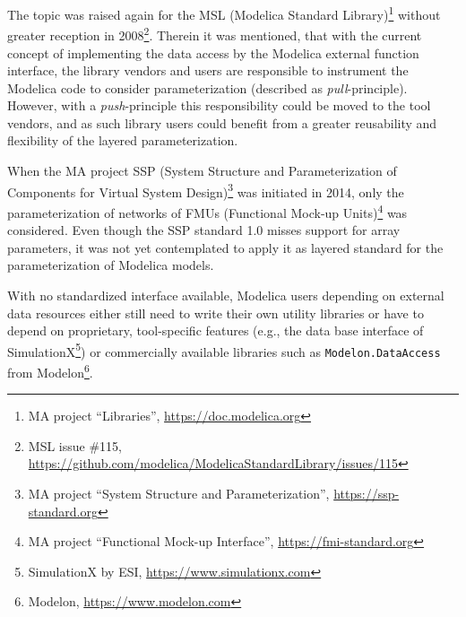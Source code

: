 \documentclass{modelica}
\newcommand{\modelica}[1]{\lstinline[language=modelica]|#1|}
\begin{document}
The topic was raised again for the MSL (Modelica Standard Library)\footnote{MA project ``Libraries'', \url{https://doc.modelica.org}} without greater reception in 2008\footnote{MSL issue \#115, \url{https://github.com/modelica/ModelicaStandardLibrary/issues/115}}. Therein it was mentioned, that with the current concept of implementing the data access by the Modelica external function interface, the library vendors and users are responsible to instrument the Modelica code to consider parameterization (described as \emph{pull}-principle). However, with a \emph{push}-principle this responsibility could be moved to the tool vendors, and as such library users could benefit from a greater reusability and flexibility of the layered parameterization.

When the MA project SSP (System Structure and Parameterization of Components for Virtual System Design)\footnote{MA project ``System Structure and Parameterization'', \url{https://ssp-standard.org}} was initiated in 2014, only the parameterization of networks of FMUs (Functional Mock-up Units)\footnote{MA project ``Functional Mock-up Interface'', \url{https://fmi-standard.org}} was considered. Even though the SSP standard 1.0 misses support for array parameters, it was not yet contemplated to apply it as layered standard for the parameterization of Modelica models.

With no standardized interface available, Modelica users depending on external data resources either still need to write their own utility libraries or have to depend on proprietary, tool-specific features (e.g., the data base interface of SimulationX\footnote{SimulationX by ESI,
\url{https://www.simulationx.com}}) or commercially available libraries such as \modelica{Modelon.DataAccess} from Modelon\footnote{Modelon, \url{https://www.modelon.com}}.

\medskip
\end{document}
